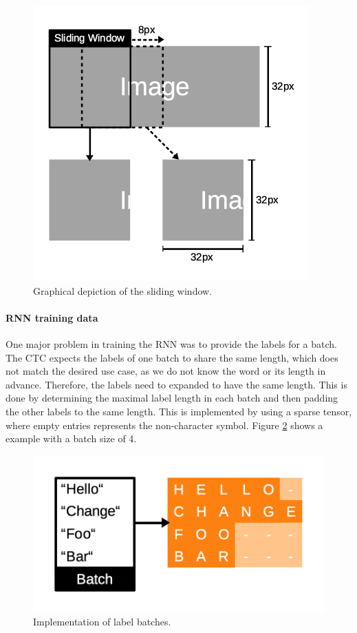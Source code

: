 \documentclass{utue} %
\begin{document}
\begin{figure}[h!]
	\centering
	\includegraphics[width=\columnwidth]{graphics/model_sliding_window.png}
	\caption{\label{fig:sliding_window} Graphical depiction of the sliding window.}
\end{figure}


\paragraph{RNN training data}
One major problem in training the RNN was to provide the labels for a batch. The CTC expects the labels of one batch to share the same length, which does not match the desired use case, as we do not know the word or its length in advance. Therefore, the labels need to expanded to have the same length. This is done by determining the maximal label length in each batch and then padding the other labels to the same length. This is implemented by using a sparse tensor, where empty entries represents the non-character symbol. Figure \ref{fig:impl_rnn_labels} shows a example with a batch size of 4.

\begin{figure}[h!]
	\centering
	\includegraphics[width=.9\columnwidth]{graphics/impl_rnn_labels.png}
	\caption{\label{fig:impl_rnn_labels} Implementation of label batches.}
\end{figure}
\end{document}
